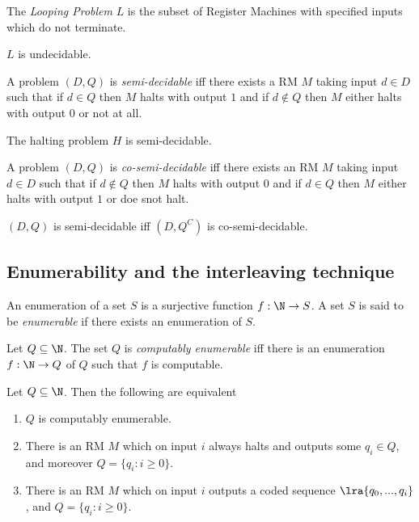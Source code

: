 \documentclass{article}
\begin{document}
\begin{definition}
    The \emph{Looping Problem} $L$ is the subset of Register Machines with specified
    inputs which do not terminate.
\end{definition}

\begin{theorem}
    $L$ is undecidable.
\end{theorem}

\begin{definition}
    A problem $(D,Q)$ is \emph{semi-decidable} iff there exists a RM $M$ taking 
    input $d\in D$ such that if $d\in Q$ then $M$ halts with output $1$ and if
    $d\not\in Q$ then $M$ either halts with output $0$ or not at all.
\end{definition}

\begin{corollary}
    The halting problem $H$ is semi-decidable.
\end{corollary}

\begin{definition}
    A problem $(D,Q)$ is \emph{co-semi-decidable} iff there exists an RM $M$
    taking input $d\in D$ such that if $d\not\in Q$ then $M$ halts with output
    $0$ and if $d\in Q$ then $M$ either halts with output $1$ or doe snot halt.
\end{definition}

\begin{theorem}
    $(D,Q)$ is semi-decidable iff $(D, Q^C)$ is co-semi-decidable.
\end{theorem}

\subsection{Enumerability and the interleaving technique}

\begin{definition}
    An enumeration of a set $S$ is a surjective function $f:\N\to S$. A set $S$ 
    is said to be \emph{enumerable} if there exists an enumeration of $S$.
\end{definition}

\begin{definition}
    Let $Q\subseteq\N$. The set $Q$ is \emph{computably enumerable} iff there is
    an enumeration $f:\N\to Q$ of $Q$ such that $f$ is computable.
\end{definition}

\begin{theorem}
    Let $Q\subseteq\N$. Then the following are equivalent
    \begin{enumerate}
        \item $Q$ is computably enumerable.
        \item There is an RM $M$ which on input $i$ always halts and outputs some $q_i\in Q$,
            and moreover $Q=\{q_i : i\geq 0\}$.
        \item There is an RM $M$ which on input $i$ outputs a coded sequence $\lra{q_0,...,q_i}$,
            and $Q=\{q_i:i\geq 0\}$.
    \end{enumerate}
\end{theorem}
\end{document}
